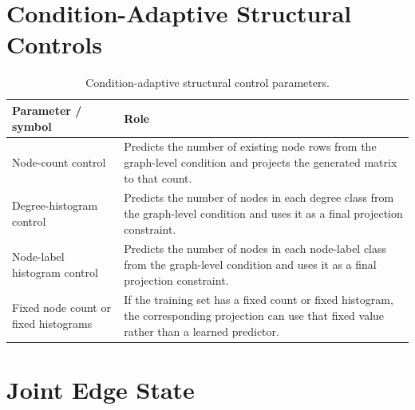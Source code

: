 \section{Condition-Adaptive Structural Controls}

\begin{table}[p]
\centering
\footnotesize
\begin{tabularx}{\textwidth}{@{}p{}X@{}}
\toprule
Parameter / symbol & Role \\
\midrule
Node-count control & Predicts the number of existing node rows from the graph-level condition and projects the generated matrix to that count. \\
Degree-histogram control & Predicts the number of nodes in each degree class from the graph-level condition and uses it as a final projection constraint. \\
Node-label histogram control & Predicts the number of nodes in each node-label class from the graph-level condition and uses it as a final projection constraint. \\
Fixed node count or fixed histograms & If the training set has a fixed count or fixed histogram, the corresponding projection can use that fixed value rather than a learned predictor. \\
\bottomrule
\end{tabularx}
\caption{Condition-adaptive structural control parameters.}
\label{tab:generator-condition-control-parameters}
\end{table}

\section{Joint Edge State}

